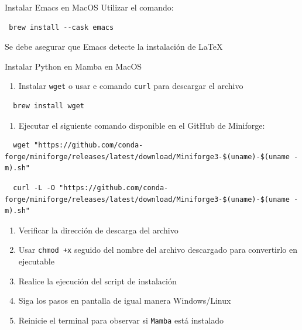 \documentclass[presentation]{beamer}
\begin{document}
\begin{frame}[label={sec:org2b8496b},fragile]{Instalar Emacs en MacOS}
 Utilizar el comando:

\begin{verbatim}
 brew install --cask emacs
\end{verbatim}

Se debe asegurar que Emacs detecte la instalación de \LaTeX
\end{frame}
\begin{frame}{Instalar Python en Mamba en MacOS}
 \begin{enumerate}
\item Instalar \texttt{wget} o usar e comando \texttt{curl} para descargar el archivo
\end{enumerate}
\begin{verbatim}
  brew install wget
\end{verbatim}
\begin{enumerate}
\item Ejecutar el siguiente comando disponible en el GitHub de Miniforge:
\end{enumerate}
\begin{verbatim}
  wget "https://github.com/conda-forge/miniforge/releases/latest/download/Miniforge3-$(uname)-$(uname -m).sh"
\end{verbatim}
\begin{verbatim}
  curl -L -O "https://github.com/conda-forge/miniforge/releases/latest/download/Miniforge3-$(uname)-$(uname -m).sh"
\end{verbatim}
\begin{enumerate}
\item Verificar la dirección de descarga del archivo
\item Usar \texttt{chmod +x} seguido del nombre del archivo descargado para
convertirlo en ejecutable
\item Realice la ejecución del script de instalación
\item Siga los pasos en pantalla de igual manera  Windows/Linux
\item Reinicie el terminal para observar si \texttt{Mamba} está instalado
\end{enumerate}
\end{frame}
\end{document}
